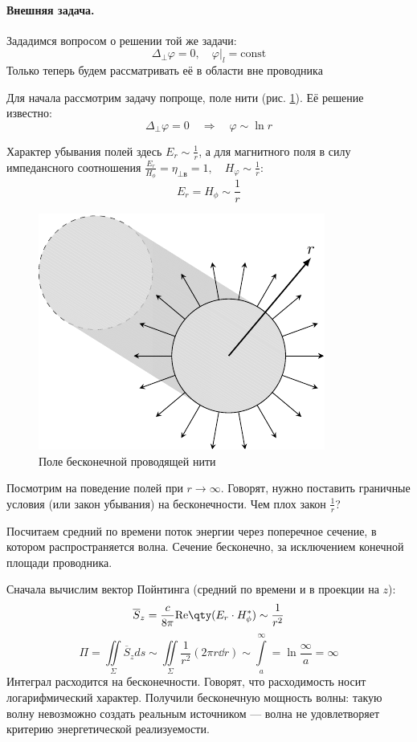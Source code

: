 \paragraph{Внешняя задача. } Зададимся вопросом о решении той же задачи:
\begin{equation*}
\Delta_\perp \varphi=0, \quad \varphi|_l=\mathrm{const}
\end{equation*}
Только теперь будем рассматривать её в области вне проводника

Для начала рассмотрим задачу попроще, поле нити (рис. \ref{fig:lect4:3}). Её решение известно:
\begin{equation*}
\Delta_\perp \varphi=0 
\quad \Rightarrow \quad
\varphi \sim \ln r
\end{equation*} 

Характер убывания полей здесь $\displaystyle E_r\sim \frac{1}{r}$, а для магнитного поля в силу импедансного соотношения
$\displaystyle\frac{E_r}{H_\phi}=\eta_{\perp\text{в}}=1, \quad H_\varphi\sim\frac{1}{r}$:
\begin{equation*} 
E_r=H_\phi\sim\frac{1}{r}
\end{equation*}
\begin{figure}[H]
	\centering
	\includegraphics[width =0.4\linewidth]{img/lect4_ris3}
	\caption{Поле бесконечной проводящей нити}
	\label{fig:lect4:3}
\end{figure}

Посмотрим на поведение полей при $r\to\infty$. Говорят, нужно поставить граничные условия (или закон убывания) на
бесконечности. Чем плох закон $\frac{1}{r}$?

Посчитаем средний по времени поток энергии через поперечное сечение, в котором распространяется волна. Сечение
бесконечно, за исключением конечной площади проводника.

Сначала вычислим вектор Пойнтинга (средний по времени и в проекции на $z$):
\begin{equation*}
\overline{S}_z=\frac{c}{8 \pi}\mathrm{Re}\qty(E_r\cdot H_\phi^*)\sim\frac{1}{r^2}
\end{equation*}
\begin{equation*}
\Pi=\iint\limits_\Sigma \overline{S}_z ds \sim
\iint\limits_\Sigma \frac{1}{r^2} (2\pi r \dd{r})
\sim \int\limits_a^\infty = \ln\frac{\infty}{a}=\infty
\end{equation*}
Интеграл расходится на бесконечности. Говорят, что расходимость носит логарифмический характер. Получили бесконечную мощность волны: такую волну невозможно создать реальным источником --- волна не удовлетворяет критерию энергетической реализуемости.


